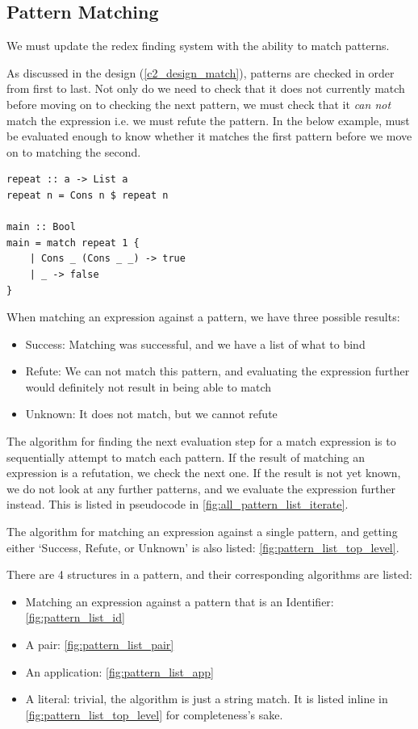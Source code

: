 
\subsection{Pattern Matching}
We must update the redex finding system with the ability to match patterns. 

As discussed in the design (\ref{c2_design_match}), patterns are checked in order from first to last. Not only do we need to check that it does not currently match before moving on to checking the next pattern, we must check that it \textit{can not} match the expression i.e. we must refute the pattern. In the below example,  must be evaluated enough to know whether it matches the first pattern before we move on to matching the second. 

\begin{lstlisting}[language=SFL]
repeat :: a -> List a
repeat n = Cons n $ repeat n

main :: Bool
main = match repeat 1 {
    | Cons _ (Cons _ _) -> true
    | _ -> false
}
\end{lstlisting}

When matching an expression against a pattern, we have three possible results:

\begin{itemize}
    \item Success: Matching was successful, and we have a list of what to bind
    \item Refute: We can not match this pattern, and evaluating the expression further would definitely not result in being able to match
    \item Unknown: It does not match, but we cannot refute
\end{itemize}

The algorithm for finding the next evaluation step for a match expression is to sequentially attempt to match each pattern. If the result of matching an expression is a refutation, we check the next one. If the result is not yet known, we do not look at any further patterns, and we evaluate the expression further instead. This is listed in pseudocode in \ref{fig:all_pattern_list_iterate}. 

The algorithm for matching an expression against a single pattern, and getting either `Success, Refute, or Unknown' is also listed: \ref{fig:pattern_list_top_level}. 

There are 4 structures in a pattern, and their corresponding algorithms are listed: 
\begin{itemize}
    \item Matching an expression against a pattern that is an Identifier: \ref{fig:pattern_list_id}
    \item A pair: \ref{fig:pattern_list_pair}
    \item An application: \ref{fig:pattern_list_app}
    \item A literal: trivial, the algorithm is just a string match. It is listed inline in \ref{fig:pattern_list_top_level} for completeness's sake. 
\end{itemize}

